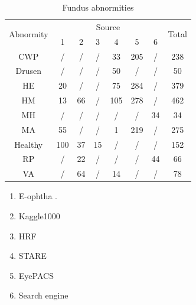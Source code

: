 \documentclass{article}
\begin{document}
	\begin{minipage}[t]{0.6\linewidth}
		{
			\fontsize{9}{12}\selectfont
			{
				\begin{longtable}{cccccccc}
					\caption{Fundus abnormities}
					\label{tb:Fundus_source}\\
					\toprule
					\multirow{2}{*}{Abnormity}&\multicolumn{6}{c}{Source}&\multirow{2}{*}{Total}\\
					&1&2&3&4&5&6&\\
					\midrule
					CWP    &/  &/ &/ &33 &205&/ &238\\
					Drusen &/  &/ &/ &50 &/  &/ &50 \\     
					HE     &20 &/ &/ &75 &284&/ &379\\ 
					HM     &13 &66&/ &105&278&/ &462\\     
					MH     &/  &/ &/ &/  &/  &34&34 \\        
					MA     &55 &/ &/ &1  &219&/ &275\\
					Healthy&100&37&15&/  &/  &/ &152\\      
					RP     &/  &22&/ &/  &/  &44&66 \\         
					VA     &/  &64&/ &14 &/  &/ &78 \\
					
					\bottomrule
				\end{longtable}
				
				\vspace{1cm}
				\begin{enumerate}[left=1.5cm]
					
					\item E-ophtha \autocite{E_ophtha}.
					\vspace{-0.2cm}
					
					\item Kaggle1000 \autocite{1000Fundus_Pytorch_TransferLearning}
					\vspace{-0.2cm}
					
					\item HRF \autocite{HRF_2013}
					\vspace{-0.2cm}
					
					\item STARE \autocite{STARE}
					\vspace{-0.2cm}
					
					\item EyePACS \autocite{DR_dataset}
					\vspace{-0.2cm}
					
					\item Search engine
					\vspace{-0.2cm}
					
				\end{enumerate}
				
				\vspace{0.5cm}
			}
		}
	\end{minipage}
	
\end{document}
